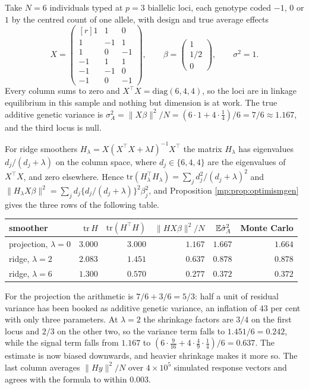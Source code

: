 \begin{example}
\label{mp:ex:optimism}
Take $N=6$ individuals typed at $p=3$ biallelic loci, each genotype coded $-1$, $0$ or $1$
by the centred count of one allele, with design and true average effects
\[
X=\begin{pmatrix*}[r]
1&1&0\\ 1&-1&1\\ 1&0&-1\\ -1&1&1\\ -1&-1&0\\ -1&0&-1
\end{pmatrix*},
\qquad
\beta=\begin{pmatrix}1\\ 1/2\\ 0\end{pmatrix},
\qquad \sigma^2=1 .
\]
Every column sums to zero and $X^\top X=\mathrm{diag}(6,4,4)$, so the loci are in linkage
equilibrium in this sample and nothing but dimension is at work. The true additive genetic
variance is $\sigma_A^2=\|X\beta\|^2/N=(6\cdot1+4\cdot\tfrac14)/6=7/6\approx1.167$, and the third
locus is null.

For ridge smoothers $H_\lambda=X(X^\top X+\lambda I)^{-1}X^\top$ the matrix $H_\lambda$ has
eigenvalues $d_j/(d_j+\lambda)$ on the column space, where $d_j\in\{6,4,4\}$ are the
eigenvalues of $X^\top X$, and zero elsewhere. Hence
$\mathrm{tr}(H_\lambda^\top H_\lambda)=\sum_j d_j^2/(d_j+\lambda)^2$ and
$\|H_\lambda X\beta\|^2=\sum_j d_j\{d_j/(d_j+\lambda)\}^2\beta_j^2$, and Proposition
\ref{mp:prop:optimismgen} gives the three rows of the following table.

\begin{center}
\begin{tabular}{lrrrrr}
\toprule
smoother & $\mathrm{tr}\,H$ & $\mathrm{tr}(H^\top H)$ & $\|HX\beta\|^2/N$ & $\mathbb{E}\hat\sigma_A^2$ & Monte Carlo \\
\midrule
projection, $\lambda=0$ & $3.000$ & $3.000$ & $1.167$ & $1.667$ & $1.664$ \\
ridge, $\lambda=2$ & $2.083$ & $1.451$ & $0.637$ & $0.878$ & $0.878$ \\
ridge, $\lambda=6$ & $1.300$ & $0.570$ & $0.277$ & $0.372$ & $0.372$ \\
\bottomrule
\end{tabular}
\end{center}

\noindent For the projection the arithmetic is $7/6+3/6=5/3$: half a unit of residual
variance has been booked as additive genetic variance, an inflation of $43$ per cent with
only three parameters. At $\lambda=2$ the shrinkage factors are $3/4$ on the first locus and
$2/3$ on the other two, so the variance term falls to $1.451/6=0.242$, while the signal term
falls from $1.167$ to $(6\cdot\tfrac9{16}+4\cdot\tfrac49\cdot\tfrac14)/6=0.637$. The estimate is
now biased downwards, and heavier shrinkage makes it more so. The last column averages
$\|Hy\|^2/N$ over $4\times10^5$ simulated response vectors and agrees with the formula to
within $0.003$.


\end{example}
